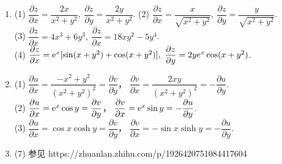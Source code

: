 \begin{enumerate}[label={\textbf{\thechapter.\arabic*}},leftmargin=
    \inteval{\myenumleftmargin}pt]
\item 
(1) $ \dfrac{\partial z}{\partial x}=\dfrac{2x}{x^2+y^2},\ 
\dfrac{\partial z}{\partial y}=\dfrac{2y}{x^2+y^2} $. \quad
(2) $ \dfrac{\partial z}{\partial x}=\dfrac{x}{\sqrt{x^2+y^2}},\ 
\dfrac{\partial z}{\partial y}=\dfrac{y}{\sqrt{x^2+y^2}} $. \\
(3) $ \dfrac{\partial z}{\partial x}=4x^3+6y^3,\ 
\dfrac{\partial z}{\partial x}=18xy^2-5y^4 $. \\
(4) $ \dfrac{\partial z}{\partial x}=\e^x[\sin(x+y^2)+\cos(x+y^2)],\ 
\dfrac{\partial z}{\partial y}=2ye^x \cos(x+y^2) $. 

\item (1) $ \dfrac{\partial u}{\partial x} =
\dfrac{-x^2+y^2}{(x^2+y^2)^2}=\dfrac{\partial v}{\partial y} $，
$ \dfrac{\partial v}{\partial x} =\dfrac{2xy}{(x^2+y^2)^2}=
-\dfrac{\partial u}{\partial y} $. \\
(2) $ \dfrac{\partial u}{\partial x} =\mathrm{e}^x \cos y=
\dfrac{\partial v}{\partial y} $，
$ \dfrac{\partial v}{\partial x} =\mathrm{e}^x \sin y=
-\dfrac{\partial u}{\partial y} $. \\
(3) $ \dfrac{\partial u}{\partial x} =\cos x\cosh y=
\dfrac{\partial v}{\partial y} $，
$ \dfrac{\partial v}{\partial x} = -\sin x\sinh y=
-\dfrac{\partial u}{\partial y} $. 

\item 
(7) 参见 https://zhuanlan.zhihu.com/p/1926420751084417604

\end{enumerate}
\myfootnote{\CopyrightStatementChap}
\cleardoublepage



